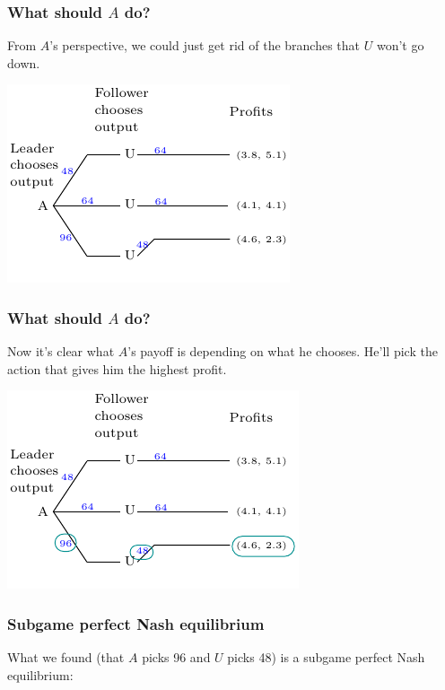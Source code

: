 \documentclass[xcolor=pdftex,dvipsnames]{beamer}
\begin{document}
\begin{frame}
  \frametitle{What should $A$ do?}
From $A$'s perspective, we could just get rid of the branches that $U$
won't go down.

  \begin{center}
    \includegraphics{pics/Stackelberg5}
  \end{center}

\end{frame}

\begin{frame}
  \frametitle{What should $A$ do?}
Now it's clear what $A$'s payoff is depending on what he
chooses. He'll pick the action that gives him the highest profit.

  \begin{center}
    \includegraphics{pics/Stackelberg6}
  \end{center}

\end{frame}


\begin{frame}
  \frametitle{Subgame perfect Nash equilibrium}
  What we found (that $A$ picks 96 and $U$ picks 48) is a
  subgame perfect Nash equilibrium:
\bigskip

\bigskip

\bigskip


\end{frame}
\end{document}
